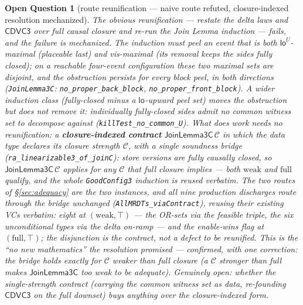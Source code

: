 \documentclass[11pt]{article}
\newtheorem{openq}[theorem]{Open Question}
\newcommand{\loE}[1]{\mathsf{lo}^{#1}}
\newcommand{\cd}{\mathsf{CDVC3}}
\newcommand{\lean}[1]{\texttt{#1}}
\begin{document}
\begin{openq}[route reunification --- naive route refuted, closure-indexed
resolution mechanized]
\label{oq:reunify}
The obvious reunification --- restate the delta laws and $\cd$ over
\emph{full} causal closure and re-run the Join Lemma induction --- fails,
and the failure is mechanized. The induction must peel an event that is
both $\loE{U}$-maximal (placeable last) and vis-maximal (its removal keeps
the sides \emph{fully} closed); on a reachable four-event configuration
these two maximal sets are \emph{disjoint}, and the obstruction persists
for every \emph{block} peel, in both directions
(\lean{JoinLemma3C}: \lean{no\_proper\_back\_block},
\lean{no\_proper\_front\_block}). A wider induction class (fully-closed
minus a $\loE{}$-upward peel set) moves the obstruction but does not
remove it: individually fully-closed sides admit no \emph{common} witness
set to decompose against (\lean{killTest\_no\_common\_U}). What
\emph{does} work needs no reunification: a \textbf{closure-indexed
contract} $\mathsf{JoinLemma3C}\,\mathcal{C}$ in which the data type
declares its closure strength $\mathcal{C}$, with a single soundness
bridge (\lean{ra\_linearizable3\_of\_joinC}): store versions are fully
causally closed, so $\mathsf{JoinLemma3C}\,\mathcal{C}$ applies for any
$\mathcal{C}$ that full closure implies --- both $\text{weak}$ and
$\text{full}$ qualify, and the whole \lean{GoodConfig3} induction is
reused verbatim. The two routes of \S\ref{sec:adequacy} are the two
instances, and \emph{all nine} production discharges route through the
bridge unchanged (\lean{AllMRDTs\_viaContract}), reusing their existing
VCs verbatim: eight at $(\text{weak},\top)$ --- the OR-sets via the
feasible triple, the six unconditional types via the delta on-ramp --- and
the enable-wins flag at $(\text{full},\top)$; the disjunction is the
contract, not a defect to be reunified. This is the ``no new mathematics''
the resolution promised --- confirmed, with one correction: the bridge
holds exactly for $\mathcal{C}$ weaker than full closure (a $\mathcal{C}$
\emph{stronger} than full makes $\mathsf{JoinLemma3C}$ too weak to be
adequate). Genuinely open: whether the single-strength contract (carrying
the common witness set as data, re-founding $\cd$ on the full downset)
buys anything over the closure-indexed form.
\end{openq}
\end{document}
